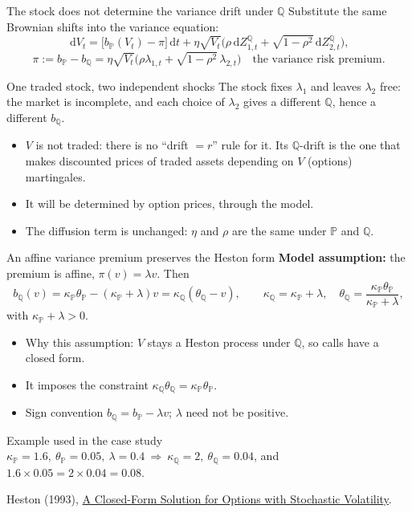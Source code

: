 \documentclass[handout,10pt,t,aspectratio=169]{beamer}
\newcommand{\Q}{\mathbb Q}
\newcommand{\Pp}{\mathbb P}
\newcommand{\dd}{\,\mathrm d}
\newcommand{\source}[1]{\vfill{\scriptsize\color{gray}#1\par}}
\begin{document}
\begin{frame}{The stock does not determine the variance drift under \(\Q\)}
\small
Substitute the same Brownian shifts into the variance equation:
\[
\dd V_t=\bigl[b_\Pp(V_t)-\pi\bigr]\dd t
+\eta\sqrt{V_t}\bigl(\rho\dd Z_{1,t}^\Q+\sqrt{1-\rho^2}\dd Z_{2,t}^\Q\bigr),
\]
\[
\boxed{\pi:=b_\Pp-b_\Q=\eta\sqrt{V_t}\bigl(\rho\lambda_{1,t}+\sqrt{1-\rho^2}\,\lambda_{2,t}\bigr)}
\quad\text{the variance risk premium.}
\]
\begin{block}{One traded stock, two independent shocks}
The stock fixes \(\lambda_1\) and leaves \(\lambda_2\) free: the market is incomplete, and
each choice of \(\lambda_2\) gives a different \(\Q\), hence a different \(b_\Q\).
\end{block}
\begin{itemize}
\item \(V\) is not traded: there is no ``drift \(=r\)'' rule for it. Its \(\Q\)-drift is the one
that makes discounted prices of traded assets depending on \(V\) (options) martingales.
\item It will be determined by option prices, through the model.
\item The diffusion term is unchanged: \(\eta\) and \(\rho\) are the same under \(\Pp\) and \(\Q\).
\end{itemize}
\end{frame}

\begin{frame}{An affine variance premium preserves the Heston form}
\small
\textbf{Model assumption:} the premium is affine, \(\pi(v)=\lambda v\). Then
\[
b_\Q(v)=\kappa_\Pp\theta_\Pp-(\kappa_\Pp+\lambda)v=\kappa_\Q(\theta_\Q-v),\qquad
\boxed{\kappa_\Q=\kappa_\Pp+\lambda,\quad
\theta_\Q=\frac{\kappa_\Pp\theta_\Pp}{\kappa_\Pp+\lambda},}
\]
with \(\kappa_\Pp+\lambda>0\).
\begin{itemize}
\item Why this assumption: \(V\) stays a Heston process under \(\Q\), so calls have a
closed form.
\item It imposes the constraint \(\kappa_\Q\theta_\Q=\kappa_\Pp\theta_\Pp\).
\item Sign convention \(b_\Q=b_\Pp-\lambda v\); \(\lambda\) need not be positive.
\end{itemize}
\begin{exampleblock}{Example used in the case study}
\(\kappa_\Pp=1.6,\ \theta_\Pp=0.05,\ \lambda=0.4\ \Longrightarrow\
\kappa_\Q=2,\ \theta_\Q=0.04\), and \(1.6\times0.05=2\times0.04=0.08\).
\end{exampleblock}
\source{Heston (1993), \href{https://finance.martinsewell.com/stylized-facts/volatility/Heston1993.pdf}{A Closed-Form Solution for Options with Stochastic Volatility}.}
\end{frame}
\end{document}
